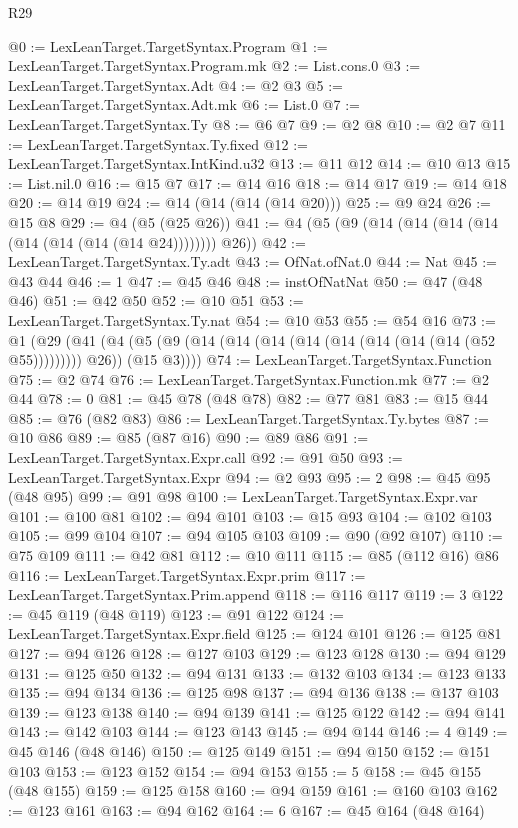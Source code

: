 \begin{lexlean}{R29}
\begin{coremodule}
@0 := LexLeanTarget.TargetSyntax.Program
@1 := LexLeanTarget.TargetSyntax.Program.mk
@2 := List.cons.{0}
@3 := LexLeanTarget.TargetSyntax.Adt
@4 := @2 @3
@5 := LexLeanTarget.TargetSyntax.Adt.mk
@6 := List.{0}
@7 := LexLeanTarget.TargetSyntax.Ty
@8 := @6 @7
@9 := @2 @8
@10 := @2 @7
@11 := LexLeanTarget.TargetSyntax.Ty.fixed
@12 := LexLeanTarget.TargetSyntax.IntKind.u32
@13 := @11 @12
@14 := @10 @13
@15 := List.nil.{0}
@16 := @15 @7
@17 := @14 @16
@18 := @14 @17
@19 := @14 @18
@20 := @14 @19
@24 := @14 (@14 (@14 (@14 @20)))
@25 := @9 @24
@26 := @15 @8
@29 := @4 (@5 (@25 @26))
@41 := @4 (@5 (@9 (@14 (@14 (@14 (@14 (@14 (@14 (@14 (@14 @24)))))))) @26))
@42 := LexLeanTarget.TargetSyntax.Ty.adt
@43 := OfNat.ofNat.{0}
@44 := Nat
@45 := @43 @44
@46 := 1
@47 := @45 @46
@48 := instOfNatNat
@50 := @47 (@48 @46)
@51 := @42 @50
@52 := @10 @51
@53 := LexLeanTarget.TargetSyntax.Ty.nat
@54 := @10 @53
@55 := @54 @16
@73 := @1
    (@29
      (@41 (@4 (@5 (@9 (@14 (@14 (@14 (@14 (@14 (@14 (@14 (@14 (@52 @55))))))))) @26)) (@15 @3))))
@74 := LexLeanTarget.TargetSyntax.Function
@75 := @2 @74
@76 := LexLeanTarget.TargetSyntax.Function.mk
@77 := @2 @44
@78 := 0
@81 := @45 @78 (@48 @78)
@82 := @77 @81
@83 := @15 @44
@85 := @76 (@82 @83)
@86 := LexLeanTarget.TargetSyntax.Ty.bytes
@87 := @10 @86
@89 := @85 (@87 @16)
@90 := @89 @86
@91 := LexLeanTarget.TargetSyntax.Expr.call
@92 := @91 @50
@93 := LexLeanTarget.TargetSyntax.Expr
@94 := @2 @93
@95 := 2
@98 := @45 @95 (@48 @95)
@99 := @91 @98
@100 := LexLeanTarget.TargetSyntax.Expr.var
@101 := @100 @81
@102 := @94 @101
@103 := @15 @93
@104 := @102 @103
@105 := @99 @104
@107 := @94 @105 @103
@109 := @90 (@92 @107)
@110 := @75 @109
@111 := @42 @81
@112 := @10 @111
@115 := @85 (@112 @16) @86
@116 := LexLeanTarget.TargetSyntax.Expr.prim
@117 := LexLeanTarget.TargetSyntax.Prim.append
@118 := @116 @117
@119 := 3
@122 := @45 @119 (@48 @119)
@123 := @91 @122
@124 := LexLeanTarget.TargetSyntax.Expr.field
@125 := @124 @101
@126 := @125 @81
@127 := @94 @126
@128 := @127 @103
@129 := @123 @128
@130 := @94 @129
@131 := @125 @50
@132 := @94 @131
@133 := @132 @103
@134 := @123 @133
@135 := @94 @134
@136 := @125 @98
@137 := @94 @136
@138 := @137 @103
@139 := @123 @138
@140 := @94 @139
@141 := @125 @122
@142 := @94 @141
@143 := @142 @103
@144 := @123 @143
@145 := @94 @144
@146 := 4
@149 := @45 @146 (@48 @146)
@150 := @125 @149
@151 := @94 @150
@152 := @151 @103
@153 := @123 @152
@154 := @94 @153
@155 := 5
@158 := @45 @155 (@48 @155)
@159 := @125 @158
@160 := @94 @159
@161 := @160 @103
@162 := @123 @161
@163 := @94 @162
@164 := 6
@167 := @45 @164 (@48 @164)

\end{coremodule}
\end{lexlean}
